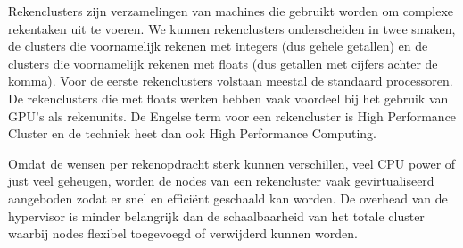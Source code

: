 Rekenclusters zijn verzamelingen van machines die gebruikt worden om complexe rekentaken uit te voeren. We kunnen rekenclusters onderscheiden in twee smaken, de clusters die voornamelijk rekenen met integers (dus gehele getallen) en de clusters die voornamelijk rekenen met floats (dus getallen met cijfers achter de komma). Voor de eerste rekenclusters volstaan meestal de standaard processoren. De rekenclusters die met floats werken hebben vaak voordeel bij het gebruik van GPU's als rekenunits. De Engelse term voor een rekencluster is High Performance Cluster en de techniek heet dan ook High Performance Computing.

Omdat de wensen per rekenopdracht sterk kunnen verschillen, veel CPU power of just veel geheugen, worden de nodes van een rekencluster vaak gevirtualiseerd aangeboden zodat er snel en effici\"ent geschaald kan worden. De overhead van de hypervisor is minder belangrijk dan de schaalbaarheid van het totale cluster waarbij nodes flexibel toegevoegd of verwijderd kunnen worden.
